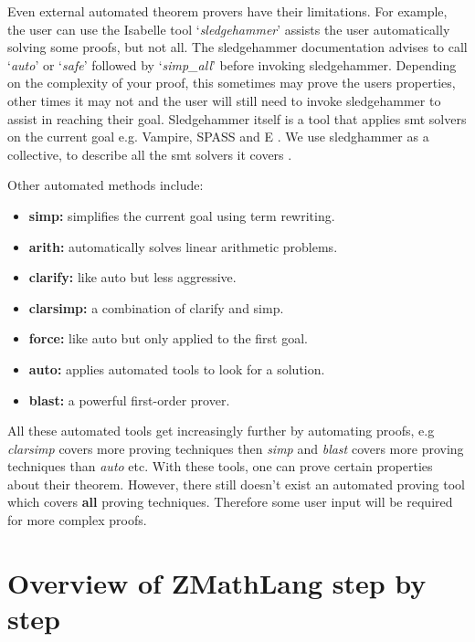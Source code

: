 Even external automated theorem provers have their limitations. For example, the user can use the Isabelle tool `\emph{sledgehammer}' assists the user automatically solving some proofs, but not all. The sledgehammer documentation advises to call `\emph{auto}' or `\emph{safe}' followed by `\emph{simp\_all}' before invoking sledgehammer. Depending on the complexity of your proof, this sometimes may prove the users properties, other times it may not and the user will still need to invoke sledgehammer to assist in reaching their goal. Sledgehammer itself is a tool that applies \gls{smt} solvers on the current goal e.g. Vampire\cite{vampire}, SPASS \cite{spass} and E \cite{e}. We use sledghammer as a collective, to describe all the \gls{smt} solvers it covers \cite{sledgehammer}.

Other automated methods include:

\begin{itemize}

\item \textbf{simp:} simplifies the current goal using term rewriting.

\item \textbf{arith:} automatically solves linear arithmetic problems.

\item \textbf{clarify:} like auto but less aggressive.

\item \textbf{clarsimp:} a combination of clarify and simp.

\item \textbf{force:} like auto but only applied to the first goal.

\item \textbf{auto:} applies automated tools to look for a solution.

\item \textbf{blast:} a powerful first-order prover. \cite{isacheat}
\end{itemize}

All these automated tools get increasingly further by automating proofs, e.g \emph{clarsimp} covers more proving techniques then \emph{simp} and \emph{blast} covers more proving techniques than \emph{auto} etc. With these tools, one can prove certain properties about their theorem. However, there still doesn't exist an automated proving tool which covers \textbf{all} proving techniques. Therefore some user input will be required for more complex proofs.

\section{Overview of ZMathLang step by step}


